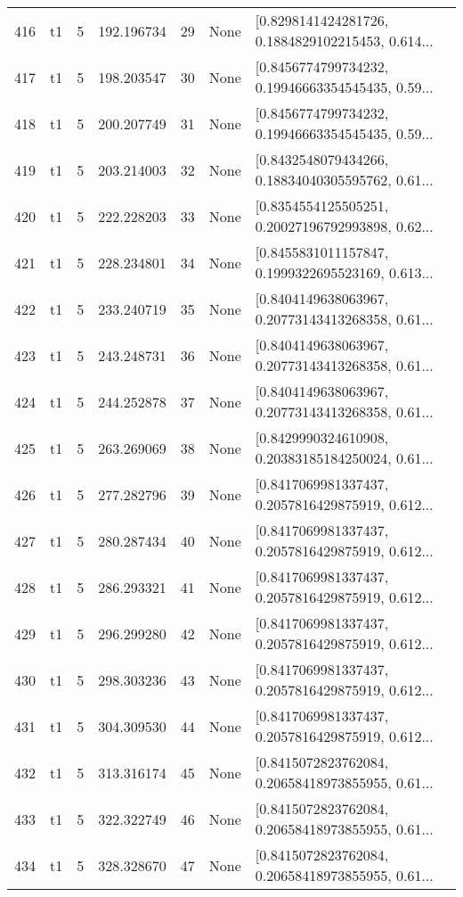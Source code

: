 \begin{tabular}{lllrlll}
416 &  t1 &   5 &  192.196734 &   29 &  None &  [0.8298141424281726, 0.1884829102215453, 0.614... \\
417 &  t1 &   5 &  198.203547 &   30 &  None &  [0.8456774799734232, 0.19946663354545435, 0.59... \\
418 &  t1 &   5 &  200.207749 &   31 &  None &  [0.8456774799734232, 0.19946663354545435, 0.59... \\
419 &  t1 &   5 &  203.214003 &   32 &  None &  [0.8432548079434266, 0.18834040305595762, 0.61... \\
420 &  t1 &   5 &  222.228203 &   33 &  None &  [0.8354554125505251, 0.20027196792993898, 0.62... \\
421 &  t1 &   5 &  228.234801 &   34 &  None &  [0.8455831011157847, 0.1999322695523169, 0.613... \\
422 &  t1 &   5 &  233.240719 &   35 &  None &  [0.8404149638063967, 0.20773143413268358, 0.61... \\
423 &  t1 &   5 &  243.248731 &   36 &  None &  [0.8404149638063967, 0.20773143413268358, 0.61... \\
424 &  t1 &   5 &  244.252878 &   37 &  None &  [0.8404149638063967, 0.20773143413268358, 0.61... \\
425 &  t1 &   5 &  263.269069 &   38 &  None &  [0.8429990324610908, 0.20383185184250024, 0.61... \\
426 &  t1 &   5 &  277.282796 &   39 &  None &  [0.8417069981337437, 0.2057816429875919, 0.612... \\
427 &  t1 &   5 &  280.287434 &   40 &  None &  [0.8417069981337437, 0.2057816429875919, 0.612... \\
428 &  t1 &   5 &  286.293321 &   41 &  None &  [0.8417069981337437, 0.2057816429875919, 0.612... \\
429 &  t1 &   5 &  296.299280 &   42 &  None &  [0.8417069981337437, 0.2057816429875919, 0.612... \\
430 &  t1 &   5 &  298.303236 &   43 &  None &  [0.8417069981337437, 0.2057816429875919, 0.612... \\
431 &  t1 &   5 &  304.309530 &   44 &  None &  [0.8417069981337437, 0.2057816429875919, 0.612... \\
432 &  t1 &   5 &  313.316174 &   45 &  None &  [0.8415072823762084, 0.20658418973855955, 0.61... \\
433 &  t1 &   5 &  322.322749 &   46 &  None &  [0.8415072823762084, 0.20658418973855955, 0.61... \\
434 &  t1 &   5 &  328.328670 &   47 &  None &  [0.8415072823762084, 0.20658418973855955, 0.61... \\

\end{tabular}

